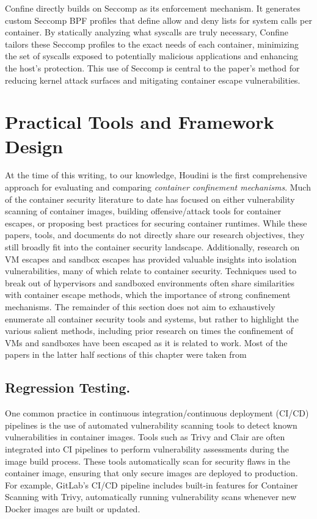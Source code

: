 \begin{doublespace}
Confine directly builds on Seccomp as its enforcement mechanism. It generates custom Seccomp BPF profiles that define allow and deny lists for system calls per container. By statically analyzing what syscalls are truly necessary, Confine tailors these Seccomp profiles to the exact needs of each container, minimizing the set of syscalls exposed to potentially malicious applications and enhancing the host’s protection. This use of Seccomp is central to the paper’s method for reducing kernel attack surfaces and mitigating container escape vulnerabilities.

\section{Practical Tools and Framework Design}

At the time of this writing, to our knowledge, Houdini is the first comprehensive approach for evaluating and comparing \textit{container confinement mechanisms}. Much of the container security literature to date has focused on either vulnerability scanning of container images, building offensive/attack tools for container escapes, or proposing best practices for securing container runtimes. While these papers, tools, and documents do not directly share our research objectives, they still broadly fit into the container security landscape. Additionally, research on VM escapes and sandbox escapes has provided valuable insights into isolation vulnerabilities, many of which relate to container security. Techniques used to break out of hypervisors and sandboxed environments often share similarities with container escape methods, which the importance of strong confinement mechanisms. The remainder of this section does not aim to exhaustively enumerate all container security tools and systems, but rather to highlight the various salient methods, including prior research on times the confinement of VMs and sandboxes have been escaped as it is related to work. Most of the papers in the latter half sections of this chapter were taken from \cite{haq2024sok}

\subsection{Regression Testing.} 

One common practice in continuous integration/continuous deployment (CI/CD) pipelines is the use of automated vulnerability scanning tools to detect known vulnerabilities in container images. Tools such as Trivy \cite{trivy} and Clair \cite{clair} are often integrated into CI pipelines to perform vulnerability assessments during the image build process. These tools automatically scan for security flaws in the container image, ensuring that only secure images are deployed to production. For example, GitLab’s CI/CD pipeline includes built-in features for Container Scanning with Trivy, automatically running vulnerability scans whenever new Docker images are built or updated.


\end{doublespace}
